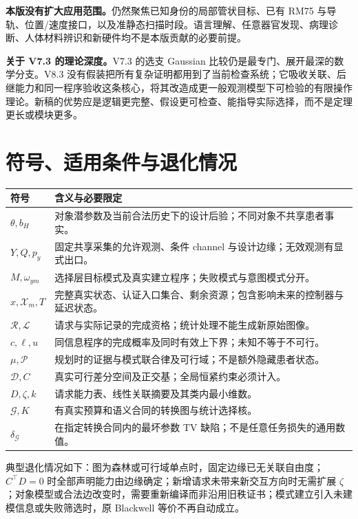 \documentclass[UTF8,11pt,a4paper,fontset=fandol]{ctexart}
\numberwithin{equation}{section}
\theoremstyle{definition}
\begin{document}
\begin{scopebox}
\textbf{本版没有扩大应用范围。}仍然聚焦已知身份的局部管状目标、已有 RM75 与导轨、位置/速度接口，以及准静态扫描时段。语言理解、任意器官发现、病理诊断、人体材料辨识和新硬件均不是本版贡献的必要前提。
\medskip\par
\textbf{关于 V7.3 的理论深度。}V7.3 的选支 Gaussian 比较仍是最专门、展开最深的数学分支。V8.3 没有假装把所有复杂证明都用到了当前检查系统；它吸收关联、后继能力和同一程序验收这条核心，将其改造成更一般观测模型下可检验的有限操作理论。新稿的优势应是逻辑更完整、假设更可检查、能指导实际选择，而不是定理更长或模块更多。
\end{scopebox}

\appendix
\section{符号、适用条件与退化情况}
\begin{longtable}{P{24mm}P{123mm}}
\toprule 符号 & 含义与必要限定\\\midrule\endhead
$\theta,b_H$ & 对象潜参数及当前合法历史下的设计后验；不同对象不共享患者事实。\\
$Y,Q,p_y$ & 固定共享采集的允许观测、条件 channel 与设计边缘；无效观测有显式出口。\\
$M,\omega_{ym}$ & 选择层目标模式及真实建立程序；失败模式与意图模式分开。\\
$x,\mathcal X_m,T$ & 完整真实状态、认证入口集合、剩余资源；包含影响未来的控制器与延迟状态。\\
$\mathcal R,\mathcal L$ & 请求与实际记录的完成资格；统计处理不能生成新原始图像。\\
$c,\ell,u$ & 同信息程序的完成概率及同时有效上下界；未知不等于不可行。\\
$\mu,\mathcal P$ & 规划时的证据与模式联合律及可行域；不是额外隐藏患者状态。\\
$\mathcal D,C$ & 真实可行差分空间及正交基；全局恒紧约束必须计入。\\
$D,\zeta,k$ & 请求能力表、线性关联摘要及其类内最小维数。\\
$\mathcal G,K$ & 有真实预算和语义合同的转换图与统计选择核。\\
$\delta_{\mathcal G}$ & 在指定转换合同内的最坏参数 TV 缺陷；不是任意任务损失的通用数值。\\
\bottomrule
\end{longtable}

典型退化情况如下：图为森林或可行域单点时，固定边缘已无关联自由度；$C^\top D=0$ 时全部声明能力由边缘确定；新增请求未带来新交互方向时无需扩展 $\zeta$；对象模型或合法边改变时，需要重新编译而非沿用旧秩证书；模式建立引入未建模信息或失败筛选时，原 Blackwell 等价不再自动成立。
\end{document}

